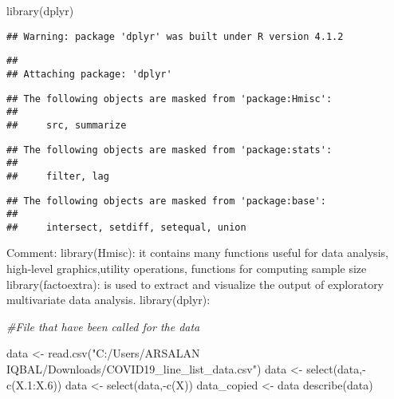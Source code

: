 \documentclass[
]{article}
\newenvironment{Shaded}{\begin{snugshade}}{\end{snugshade}}
\newcommand{\CommentTok}[1]{\textcolor[rgb]{0.56,0.35,0.01}{\textit{#1}}}
\newcommand{\FloatTok}[1]{\textcolor[rgb]{0.00,0.00,0.81}{#1}}
\newcommand{\FunctionTok}[1]{\textcolor[rgb]{0.00,0.00,0.00}{#1}}
\newcommand{\NormalTok}[1]{#1}
\newcommand{\OtherTok}[1]{\textcolor[rgb]{0.56,0.35,0.01}{#1}}
\newcommand{\SpecialCharTok}[1]{\textcolor[rgb]{0.00,0.00,0.00}{#1}}
\newcommand{\StringTok}[1]{\textcolor[rgb]{0.31,0.60,0.02}{#1}}
\begin{document}
\begin{Shaded}
\begin{Highlighting}[]
\FunctionTok{library}\NormalTok{(dplyr)}
\end{Highlighting}
\end{Shaded}

\begin{verbatim}
## Warning: package 'dplyr' was built under R version 4.1.2
\end{verbatim}

\begin{verbatim}
## 
## Attaching package: 'dplyr'
\end{verbatim}

\begin{verbatim}
## The following objects are masked from 'package:Hmisc':
## 
##     src, summarize
\end{verbatim}

\begin{verbatim}
## The following objects are masked from 'package:stats':
## 
##     filter, lag
\end{verbatim}

\begin{verbatim}
## The following objects are masked from 'package:base':
## 
##     intersect, setdiff, setequal, union
\end{verbatim}

Comment: library(Hmisc): it contains many functions useful for data
analysis, high-level graphics,utility operations, functions for
computing sample size library(factoextra): is used to extract and
visualize the output of exploratory multivariate data analysis.
library(dplyr):

\begin{Shaded}
\begin{Highlighting}[]
\CommentTok{\#File that have been called for the data}

\NormalTok{data }\OtherTok{\textless{}{-}} \FunctionTok{read.csv}\NormalTok{(}\StringTok{"C:/Users/ARSALAN IQBAL/Downloads/COVID19\_line\_list\_data.csv"}\NormalTok{)}
\NormalTok{data }\OtherTok{\textless{}{-}} \FunctionTok{select}\NormalTok{(data,}\SpecialCharTok{{-}}\FunctionTok{c}\NormalTok{(X}\FloatTok{.1}\SpecialCharTok{:}\NormalTok{X}\FloatTok{.6}\NormalTok{))}
\NormalTok{data }\OtherTok{\textless{}{-}} \FunctionTok{select}\NormalTok{(data,}\SpecialCharTok{{-}}\FunctionTok{c}\NormalTok{(X))}
\NormalTok{data\_copied }\OtherTok{\textless{}{-}}\NormalTok{ data}
\FunctionTok{describe}\NormalTok{(data)}
\end{Highlighting}
\end{Shaded}
\end{document}
